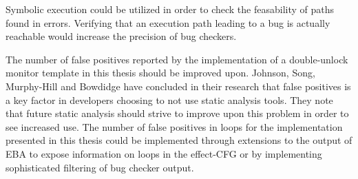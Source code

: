 \newpar Symbolic execution \cite{symbolic-execution} could be utilized in order to check the feasability of paths found in errors. Verifying that an execution path leading to a bug is actually reachable would increase the precision of bug checkers.  

\newpar The number of false positives reported by the implementation of a double-unlock monitor template in this thesis should be improved upon. Johnson, Song, Murphy-Hill and Bowdidge \cite{false-positives} have concluded in their research that false positives is a key factor in developers choosing to not use static analysis tools. They note that future static analysis should strive to improve upon this problem in order to see increased use. The number of false positives in loops for the implementation presented in this thesis could be implemented through extensions to the output of EBA to expose information on loops in the effect-CFG or by implementing sophisticated filtering of bug checker output.